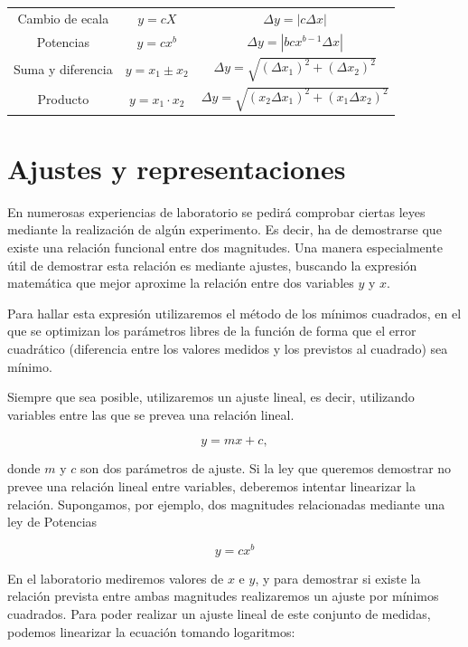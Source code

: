 \documentclass{book}
\begin{document}
\begin{center}
  \begin{tabular}{ccc}
    Cambio de ecala & $y = c X$ & $\Delta y = | c \Delta x |$  \\
    Potencias & $y = c x^b$ & $\Delta y = | b c x^{b-1} \Delta x|$ \\
    Suma y diferencia & $y = x_1 \pm x_2$ & $\Delta y = \sqrt{(\Delta x_1)^2 + (\Delta x_2)^2}$ \\
    Producto & $y = x_1 \cdot x_2$ & $\Delta y = \sqrt{(x_2 \Delta x_1)^2 + (x_1 \Delta x_2)^2}$ \\ 
  \end{tabular} 
\end{center}


\section{Ajustes y representaciones}

En numerosas experiencias de laboratorio se pedirá comprobar ciertas leyes mediante la realización
de algún experimento. Es decir, ha de demostrarse que existe una relación funcional entre dos
magnitudes. Una manera especialmente útil de demostrar esta relación es mediante ajustes, buscando
la expresión matemática que mejor aproxime la relación entre dos variables $y$ y $x$.

Para hallar esta expresión utilizaremos el método de los mínimos cuadrados, en el que se optimizan
los parámetros libres de la función de forma que el error cuadrático (diferencia entre los valores
medidos y los previstos al cuadrado) sea mínimo.

Siempre que sea posible, utilizaremos un ajuste lineal, es decir, utilizando variables entre las
que se prevea una relación lineal. 

\begin{equation}
  y = m x + c ,
\end{equation}

donde $m$ y $c$ son dos parámetros de ajuste. Si la ley que queremos demostrar no prevee una 
relación lineal
entre variables, deberemos intentar linearizar la relación. Supongamos, por ejemplo, dos magnitudes
relacionadas mediante una ley de Potencias

\begin{equation}
  y = c x^b
\end{equation}

En el laboratorio mediremos valores de $x$ e $y$, y para demostrar si existe la relación prevista
entre ambas magnitudes realizaremos un ajuste por mínimos cuadrados. Para poder realizar un ajuste
lineal de este conjunto de medidas, podemos linearizar la ecuación tomando logaritmos:
\end{document}
